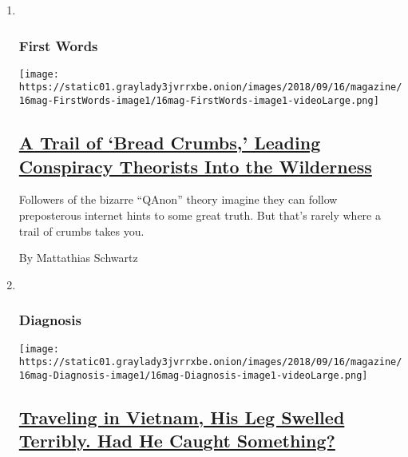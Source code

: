 \begin{enumerate}
\def\labelenumi{\arabic{enumi}.}
\item ~
  \hypertarget{first-words}{%
  \subsubsection{First Words}\label{first-words}}

  \texttt{[image: https://static01.graylady3jvrrxbe.onion/images/2018/09/16/magazine/16mag-FirstWords-image1/16mag-FirstWords-image1-videoLarge.png]}

  \hypertarget{a-trail-of-bread-crumbs-leading-conspiracy-theorists-into-the-wilderness}{%
  \subsection{\texorpdfstring{\href{/2018/09/11/magazine/a-trail-of-bread-crumbs-leading-conspiracy-theorists-into-the-wilderness.html}{A
  Trail of `Bread Crumbs,' Leading Conspiracy Theorists Into the
  Wilderness}}{A Trail of `Bread Crumbs,' Leading Conspiracy Theorists Into the Wilderness}}\label{a-trail-of-bread-crumbs-leading-conspiracy-theorists-into-the-wilderness}}

  Followers of the bizarre ``QAnon'' theory imagine they can follow
  preposterous internet hints to some great truth. But that's rarely
  where a trail of crumbs takes you.

  By Mattathias Schwartz
\item ~
  \hypertarget{diagnosis}{%
  \subsubsection{Diagnosis}\label{diagnosis}}

  \texttt{[image: https://static01.graylady3jvrrxbe.onion/images/2018/09/16/magazine/16mag-Diagnosis-image1/16mag-Diagnosis-image1-videoLarge.png]}

  \hypertarget{traveling-in-vietnam-his-leg-swelled-terribly-had-he-caught-something}{%
  \subsection{\texorpdfstring{\href{/2018/09/12/magazine/traveling-in-vietnam-his-leg-swelled-terribly-had-he-caught-something.html}{Traveling
  in Vietnam, His Leg Swelled Terribly. Had He Caught
  Something?}}{Traveling in Vietnam, His Leg Swelled Terribly. Had He Caught Something?}}\label{traveling-in-vietnam-his-leg-swelled-terribly-had-he-caught-something}}


\end{enumerate}
